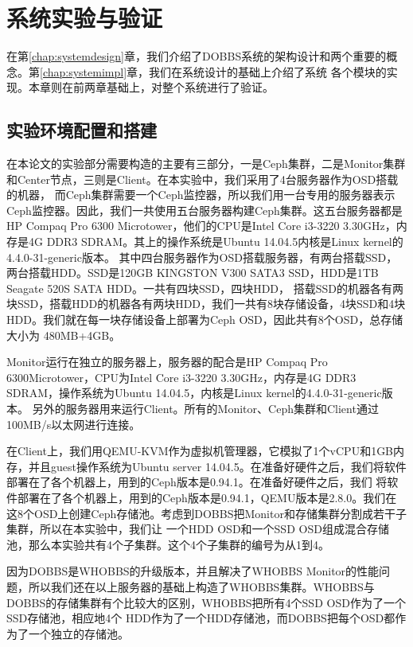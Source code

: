 
\chapter{系统实验与验证}
\label{chap:experiment}
在第\ref{chap:systemdesign}章，我们介绍了DOBBS系统的架构设计和两个重要的概念。第\ref{chap:systemimpl}章，我们在系统设计的基础上介绍了系统
各个模块的实现。本章则在前两章基础上，对整个系统进行了验证。

\section{实验环境配置和搭建}
在本论文的实验部分需要构造的主要有三部分，一是Ceph集群，二是Monitor集群和Center节点，三则是Client。在本实验中，我们采用了4台服务器作为OSD搭载的机器，
而Ceph集群需要一个Ceph监控器，所以我们用一台专用的服务器表示Ceph监控器。因此，我们一共使用五台服务器构建Ceph集群。这五台服务器都是HP Compaq Pro 6300
Microtower，他们的CPU是Intel Core i3-3220 3.30GHz，内存是4G DDR3 SDRAM。其上的操作系统是Ubuntu 14.04.5内核是Linux kernel的4.4.0-31-generic版本。
其中四台服务器作为OSD搭载服务器，有两台搭载SSD，两台搭载HDD。SSD是120GB KINGSTON V300 SATA3 SSD，HDD是1TB Seagate 520S SATA HDD。一共有四块SSD，四块HDD，
搭载SSD的机器各有两块SSD，搭载HDD的机器各有两块HDD，我们一共有8块存储设备，4块SSD和4块HDD。我们就在每一块存储设备上部署为Ceph OSD，因此共有8个OSD，总存储大小为
480MB+4GB。

Monitor运行在独立的服务器上，服务器的配合是HP Compaq Pro 6300Microtower，CPU为Intel Core i3-3220 3.30GHz，内存是4G DDR3 SDRAM，操作系统为Ubuntu 14.04.5，内核是Linux kernel的4.4.0-31-generic版本。
另外的服务器用来运行Client。所有的Monitor、Ceph集群和Client通过100MB/s以太网进行连接。

在Client上，我们用QEMU-KVM作为虚拟机管理器，它模拟了1个vCPU和1GB内存，并且guest操作系统为Ubuntu server 14.04.5。在准备好硬件之后，我们将软件部署在了各个机器上，用到的Ceph版本是0.94.1。在准备好硬件之后，我们
将软件部署在了各个机器上，用到的Ceph版本是0.94.1，QEMU版本是2.8.0。我们在这8个OSD上创建Ceph存储池。考虑到DOBBS把Monitor和存储集群分割成若干子集群，所以在本实验中，我们让
一个HDD OSD和一个SSD OSD组成混合存储池，那么本实验共有4个子集群。这个4个子集群的编号为从1到4。

因为DOBBS是WHOBBS的升级版本，并且解决了WHOBBS Monitor的性能问题，所以我们还在以上服务器的基础上构造了WHOBBS集群。WHOBBS与DOBBS的存储集群有个比较大的区别，WHOBBS把所有4个SSD OSD作为了一个SSD存储池，相应地4个
HDD作为了一个HDD存储池，而DOBBS把每个OSD都作为了一个独立的存储池。

